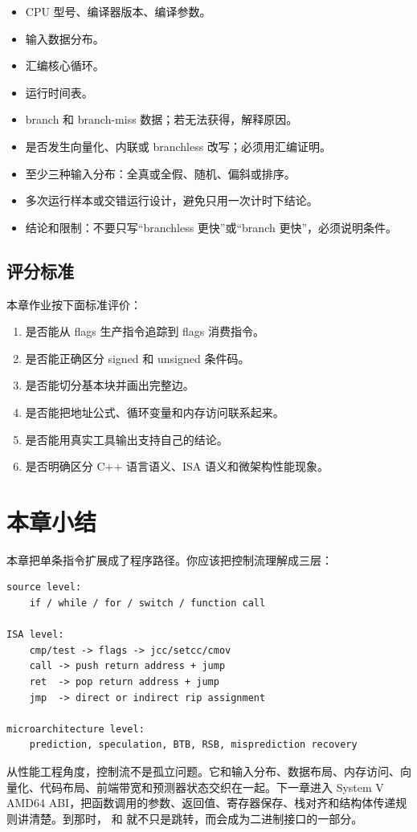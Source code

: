 \begin{exercisebox}
\begin{itemize}
  \item CPU 型号、编译器版本、编译参数。
  \item 输入数据分布。
  \item 汇编核心循环。
  \item 运行时间表。
  \item branch 和 branch-miss 数据；若无法获得，解释原因。
  \item 是否发生向量化、内联或 branchless 改写；必须用汇编证明。
  \item 至少三种输入分布：全真或全假、随机、偏斜或排序。
  \item 多次运行样本或交错运行设计，避免只用一次计时下结论。
  \item 结论和限制：不要只写“branchless 更快”或“branch 更快”，必须说明条件。
\end{itemize}

\subsection*{评分标准}

本章作业按下面标准评价：

\begin{enumerate}
  \item 是否能从 flags 生产指令追踪到 flags 消费指令。
  \item 是否能正确区分 signed 和 unsigned 条件码。
  \item 是否能切分基本块并画出完整边。
  \item 是否能把地址公式、循环变量和内存访问联系起来。
  \item 是否能用真实工具输出支持自己的结论。
  \item 是否明确区分 C++ 语言语义、ISA 语义和微架构性能现象。
\end{enumerate}
\end{exercisebox}

\section{本章小结}

本章把单条指令扩展成了程序路径。你应该把控制流理解成三层：

\begin{lstlisting}
source level:
    if / while / for / switch / function call

ISA level:
    cmp/test -> flags -> jcc/setcc/cmov
    call -> push return address + jump
    ret  -> pop return address + jump
    jmp  -> direct or indirect rip assignment

microarchitecture level:
    prediction, speculation, BTB, RSB, misprediction recovery
\end{lstlisting}

从性能工程角度，控制流不是孤立问题。它和输入分布、数据布局、内存访问、向量化、代码布局、前端带宽和预测器状态交织在一起。下一章进入 System V AMD64 ABI，把函数调用的参数、返回值、寄存器保存、栈对齐和结构体传递规则讲清楚。到那时， 和  就不只是跳转，而会成为二进制接口的一部分。

